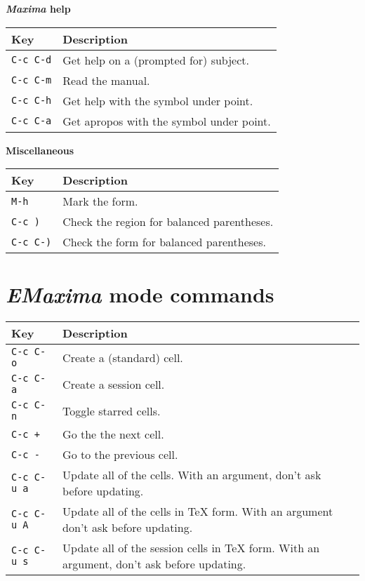 \documentclass{article}
\newcommand{\emx}{\textsl{\sffamily EMaxima}}
\newcommand{\mx}{\textsl{\sffamily Maxima}}
\begin{document}
\smallskip

\noindent
\textbf{\mx{} help}

\smallskip

\noindent
\begin{tabular}{p{\firstcol}p{\secondcol}}
\hline
\textbf{Key} & \textbf{Description}\\
\hline
\texttt{C-c C-d}
& Get help on a (prompted for) subject.\\
\texttt{C-c C-m}
& Read the manual.\\
\texttt{C-c C-h} & Get help with the symbol under point.\\
\texttt{C-c C-a} & Get apropos with the symbol under point.
\end{tabular}

\smallskip

\noindent
\textbf{Miscellaneous}

\smallskip

\noindent
\begin{tabular}{p{\firstcol}p{\secondcol}}
\hline
\textbf{Key} & \textbf{Description}\\
\hline
\texttt{M-h} & Mark the form.\\
\texttt{C-c )} & Check the region for balanced parentheses.\\
\texttt{C-c C-)} & Check the form for balanced parentheses.
\end{tabular}

\section{\emx{} mode commands}
\label{app:emx}

\noindent
\begin{tabular}{p{\firstcol}p{\secondcol}}
\hline
\textbf{Key} & \textbf{Description}\\
\hline
\texttt{C-c C-o} & Create a (standard) cell.\\
\texttt{C-c C-a} & Create a session cell.\\
\texttt{C-c C-n} & Toggle starred cells.\\
\texttt{C-c +} & Go the the next cell.\\
\texttt{C-c -} & Go to the previous cell.\\
\texttt{C-c C-u a} & 
Update all of the cells.  With an argument, don't ask before updating.\\
\texttt{C-c C-u A}
& Update all of the cells in \TeX{} form. With an argument don't ask
before updating.\\
\texttt{C-c C-u s}
& Update all of the session cells in \TeX{} form.  With an
argument, don't ask before updating.
\end{tabular}
\end{document}
